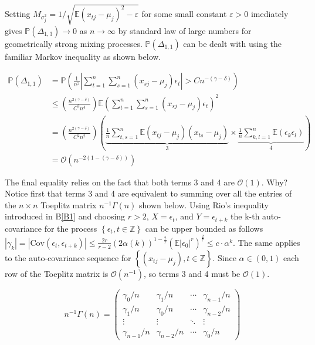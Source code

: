 \documentclass[11pt]{report}\usepackage[utf8]{inputenc}
\begin{document}
Setting $M_{\sigma^2_j}  = 1/\sqrt{\mathbb{E}\left ( x_{tj} - \mu_j \right )^2 - \varepsilon}$ for some small constant $\varepsilon > 0$ imediately gives $\mathbb{P}\left ( \Delta_{1,3} \right ) \rightarrow 0$ as $n \rightarrow \infty$ by standard law of large numbers for geometrically strong mixing processes. $\mathbb{P}\left ( \Delta_{1,1} \right )$ can be dealt with using the familiar Markov inequality as shown below. 

\begin{align*}
    \mathbb{P}\left ( \Delta_{1,1} \right ) & = \mathbb{P}\left ( \frac{1}{n^2} \left | \sum_{t=1}^{n} \sum_{s=1}^{n} \left ( x_{sj} - \mu_j \right ) \epsilon_t \right | > Cn^{-\left ( \gamma-\delta \right )} \right ) \\ 
    & \leq \left ( \frac{n^{2\left ( \gamma-\delta \right )}}{C^2n^4} \right ) \mathbb{E} \left ( \sum_{t=1}^{n} \sum_{s=1}^{n} \left ( x_{sj} - \mu_j \right ) \epsilon_t \right )^2 \\
    & = \left ( \frac{n^{2\left ( \gamma-\delta \right )}}{C^2n^2} \right ) \left ( \underbrace{\frac{1}{n} \sum_{t,s = 1}^{n} \mathbb{E} \left ( x_{tj} - \mu_j \right ) \left ( x_{ts} - \mu_j \right )}_3 \times \underbrace{\frac{1}{n}\sum_{k,l = 1}^{n} \mathbb{E} \left ( \epsilon_k \epsilon_l\right ) }_4  \right ) \\
    & = \mathcal{O}\left ( n^{-2(1-\left ( \gamma-\delta \right ))} \right )
\end{align*}

The final equality relies on the fact that both terms 3 and 4 are $\mathcal{O}(1)$. Why? Notice first that terms 3 and 4 are equivalent to summing over all the entries of the $n \times n$ Toeplitz matrix $n^{-1}\Gamma(n)$ shown below. Using Rio's inequality introduced in B\ref{B1} and choosing $r>2$, $X = \epsilon_t$, and $Y = \epsilon_{t+k}$ the k-th auto-covariance for the process $\left \{ \epsilon_t, t \in \mathbb{Z} \right \}$ can be upper bounded as follows $\left | \gamma_{k} \right |  = \left | \text{Cov}\left ( \epsilon_t,\epsilon_{t+k} \right ) \right | \leq \frac{2r}{r-2}\left ( 2 \alpha(k) \right )^{1-\frac{2}{r}} \left ( \mathbb{E}\left | \epsilon_0 \right |^r \right )^{\frac{2}{r}} \leq c \cdot \alpha^k$. The same applies to the auto-covariance sequence for $\left\{ (x_{tj} - \mu_j), t \in \mathbb{Z} \right \}$. Since $\alpha \in (0,1)$ each row of the Toeplitz matrix is $\mathcal{O}(n^{-1})$, so terms 3 and 4 must be $\mathcal{O}(1)$. 

\begin{equation*}
n^{-1} \Gamma(n) =  \begin{pmatrix}
\gamma_0/n & \gamma_1/n & \cdots & \gamma_{n-1}/n\\ 
\gamma_1/n & \gamma_0/n & \cdots & \gamma_{n-2}/n\\ 
\vdots  & \vdots  & \ddots  & \vdots  \\ 
\gamma_{n-1}/n & \gamma_{n-2}/n & \cdots  & \gamma_0/n
\end{pmatrix}
\end{equation*}
\end{document}
